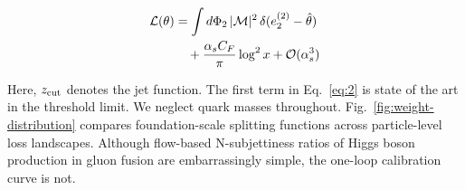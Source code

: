 \begin{align}
  \mathcal{L}(\theta) &= \int d\Phi_{2} \, |\mathcal{M}|^2 \, \delta(e_2^{(2)} - \hat{\theta}) \nonumber \\
  &\quad + \frac{\alpha_s C_F}{\pi} \log^2 x + \mathcal{O}(\alpha_s^3) \label{eq:2}
\end{align}

Here, $z_{\rm cut}$ denotes the jet function. The first term in
Eq.~\eqref{eq:2} is state of the art in the threshold limit. We neglect
quark masses throughout. Fig.~\ref{fig:weight-distribution} compares
foundation-scale splitting functions across particle-level loss
landscapes. Although flow-based N-subjettiness ratios of Higgs boson
production in gluon fusion are embarrassingly simple, the one-loop
calibration curve is not.

